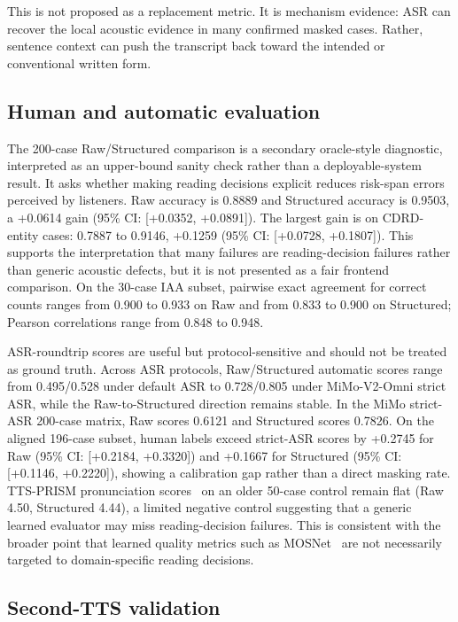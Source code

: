 \documentclass{article}
\begin{document}
This is not proposed as a replacement metric. It is mechanism evidence: ASR can recover the local acoustic evidence in many confirmed masked cases. Rather, sentence context can push the transcript back toward the intended or conventional written form.

\subsection{Human and automatic evaluation}

The 200-case Raw/Structured comparison is a secondary oracle-style diagnostic, interpreted as an upper-bound sanity check rather than a deployable-system result. It asks whether making reading decisions explicit reduces risk-span errors perceived by listeners. Raw accuracy is 0.8889 and Structured accuracy is 0.9503, a +0.0614 gain (95\% CI: [+0.0352, +0.0891]). The largest gain is on CDRD-entity cases: 0.7887 to 0.9146, +0.1259 (95\% CI: [+0.0728, +0.1807]). This supports the interpretation that many failures are reading-decision failures rather than generic acoustic defects, but it is not presented as a fair frontend comparison. On the 30-case IAA subset, pairwise exact agreement for correct counts ranges from 0.900 to 0.933 on Raw and from 0.833 to 0.900 on Structured; Pearson correlations range from 0.848 to 0.948.

ASR-roundtrip scores are useful but protocol-sensitive and should not be treated as ground truth. Across ASR protocols, Raw/Structured automatic scores range from 0.495/0.528 under default ASR to 0.728/0.805 under MiMo-V2-Omni strict ASR, while the Raw-to-Structured direction remains stable. In the MiMo strict-ASR 200-case matrix, Raw scores 0.6121 and Structured scores 0.7826. On the aligned 196-case subset, human labels exceed strict-ASR scores by +0.2745 for Raw (95\% CI: [+0.2184, +0.3320]) and +0.1667 for Structured (95\% CI: [+0.1146, +0.2220]), showing a calibration gap rather than a direct masking rate. TTS-PRISM pronunciation scores~\cite{tts_prism} on an older 50-case control remain flat (Raw 4.50, Structured 4.44), a limited negative control suggesting that a generic learned evaluator may miss reading-decision failures. This is consistent with the broader point that learned quality metrics such as MOSNet~\cite{lo2019mosnet} are not necessarily targeted to domain-specific reading decisions.

\subsection{Second-TTS validation}
\end{document}
